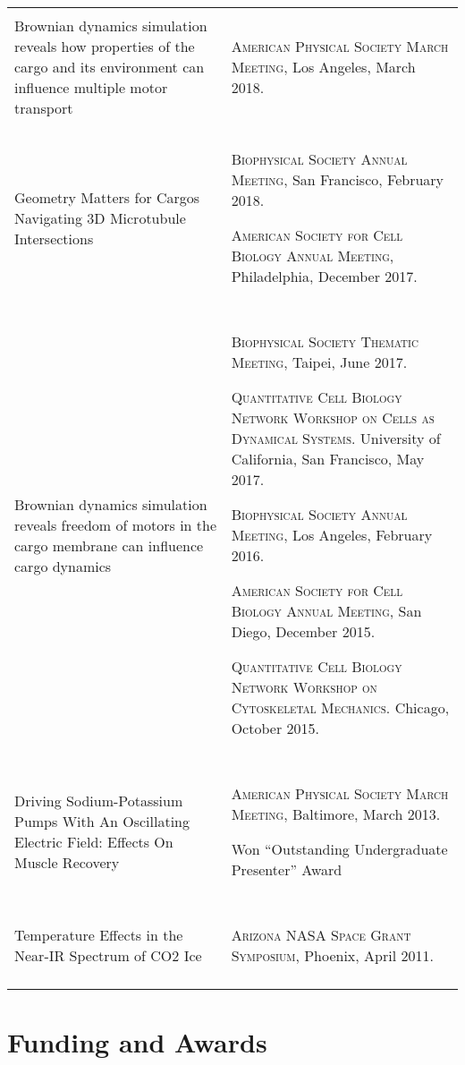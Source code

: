 \documentclass[letterpaper,10pt]{article} %
\makeatletter
\newcommand\cellwidth{\TX@col@width}
\newcommand{\presentation}[3]{
\begin{minipage}{.4\textwidth}
\textbf{#1:}\\#2
\end{minipage}
&
\begin{minipage}{\cellwidth}
\begin{description}[itemsep=.25ex,labelsep=0em]
#3
\end{description}
\end{minipage} \\

\multicolumn{2}{c}{} \\
}
\makeatother
\begin{document}
\begin{tabularx}{\textwidth}{p{} | X}
\presentation{Talk}{Brownian dynamics simulation reveals how properties of the cargo and its environment can influence multiple motor transport}{
\item \textsc{American Physical Society March Meeting}, Los Angeles, March 2018.
}

\presentation{Poster}{Geometry Matters for Cargos Navigating 3D Microtubule Intersections}{
\item \textsc{Biophysical Society Annual Meeting}, San Francisco, February 2018.
\item \textsc{American Society for Cell Biology Annual Meeting}, Philadelphia, December 2017.
}

\presentation{Poster}{Brownian dynamics simulation reveals freedom of motors in the cargo membrane can influence cargo dynamics}{
\item \textsc{Biophysical Society Thematic Meeting}, Taipei, June 2017.
\item \textsc{Quantitative Cell Biology Network Workshop on Cells as Dynamical Systems.} University of California, San Francisco, May 2017.
\item \textsc{Biophysical Society Annual Meeting}, Los Angeles, February 2016.
\item \textsc{American Society for Cell Biology Annual Meeting}, San Diego, December 2015.
\item \textsc{Quantitative Cell Biology Network Workshop on Cytoskeletal Mechanics.} Chicago, October 2015.
}

\presentation{Talk}{Driving Sodium-Potassium Pumps With An Oscillating Electric Field: Effects On Muscle Recovery}{
\item \textsc{American Physical Society March Meeting}, Baltimore, March 2013.
\item Won ``Outstanding Undergraduate Presenter'' Award
}

\presentation{Talk}{Temperature Effects in the Near-IR Spectrum of CO2 Ice}{
\item \textsc{Arizona NASA Space Grant Symposium}, Phoenix, April 2011.
}

\end{tabularx}

\bigskip
\section*{Funding and Awards}
\bigskip
\end{document}
